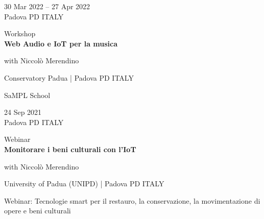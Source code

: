 \documentclass[7pt,a4paper]{article}
\begin{document}
\begin{mdframed}[
    backgroundcolor=entrygray,
    linecolor=entrygray,
    linewidth=0pt,
    innerleftmargin=6pt,
    innerrightmargin=6pt,
    innertopmargin=6pt,
    innerbottommargin=6pt,
    skipabove=0pt,
    skipbelow=0pt
]

\begin{minipage}[t]{0.28\textwidth}

30 Mar 2022 – 27 Apr 2022
\\\scriptsize Padova PD ITALY

\end{minipage}
\begin{minipage}[t]{0.68\textwidth}
\small Workshop
\\\normalsize \textbf{Web Audio e IoT per la musica}
\par \scriptsize with Niccolò Merendino
\par \small Conservatory Padua | \scriptsize Padova PD ITALY
\vspace{0.1cm}
\par \scriptsize SaMPL School
\end{minipage}
\vspace{0.25cm}
\end{mdframed}


\begin{mdframed}[
    backgroundcolor=white,
    linecolor=white,
    linewidth=0pt,
    innerleftmargin=6pt,
    innerrightmargin=6pt,
    innertopmargin=6pt,
    innerbottommargin=6pt,
    skipabove=0pt,
    skipbelow=0pt
]

\begin{minipage}[t]{0.28\textwidth}

24 Sep 2021
\\\scriptsize Padova PD ITALY

\end{minipage}
\begin{minipage}[t]{0.68\textwidth}
\small Webinar
\\\normalsize \textbf{Monitorare i beni culturali con l'IoT}
\par \scriptsize with Niccolò Merendino
\par \small University of Padua (UNIPD) | \scriptsize Padova PD ITALY
\vspace{0.1cm}
\par \scriptsize Webinar: Tecnologie smart per il restauro, la conservazione, la movimentazione di opere e beni culturali
\end{minipage}
\vspace{0.25cm}
\end{mdframed}
\end{document}
